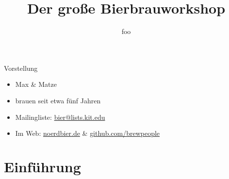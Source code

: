 \documentclass[9pt, ngerman]{beamer}
\title{Der große Bierbrauworkshop}
\author{foo}
\begin{document}
\maketitle


\begin{frame}{Vorstellung}
  \begin{itemize}
    \item Max \& Matze
    \item brauen seit etwa fünf Jahren
  \end{itemize}

  \begin{itemize}
    \item Mailingliste: \url{bier@lists.kit.edu}
    \item Im Web: \url{noerdbier.de} \& \url{github.com/brewpeople}
  \end{itemize}
\end{frame}

\section{Einführung}
\end{document}
